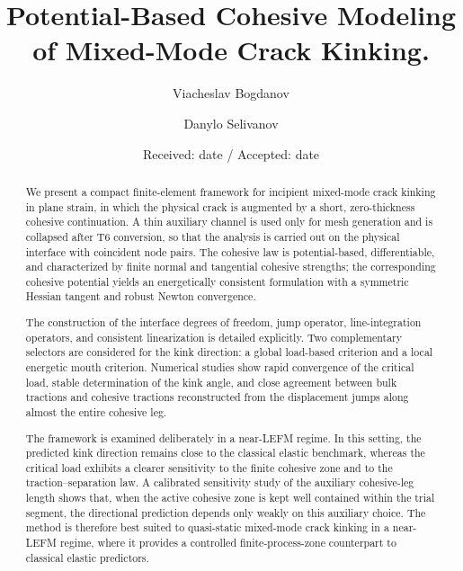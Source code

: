 \documentclass[smallextended]{svjour3}       %
\begin{document}
\title{Potential-Based Cohesive Modeling of Mixed-Mode Crack Kinking.}

\author{Viacheslav Bogdanov          \and
	Danylo Selivanov %
}



\date{Received: date / Accepted: date}


\maketitle

\begin{abstract}
	We present a compact finite-element framework for incipient mixed-mode crack
	kinking in plane strain, in which the physical crack is augmented by a short,
	zero-thickness cohesive continuation. A thin auxiliary channel is used only
	for mesh generation and is collapsed after T6 conversion, so that the
	analysis is carried out on the physical interface with coincident node pairs.
	The cohesive law is potential-based, differentiable, and characterized by finite normal and tangential cohesive strengths; the corresponding cohesive potential yields
	an energetically consistent formulation with a symmetric Hessian tangent and
	robust Newton convergence.
	
	The construction of the interface degrees of freedom, jump operator,
	line-integration operators, and consistent linearization is detailed
	explicitly. Two complementary selectors are considered for the kink
	direction: a global load-based criterion and a local energetic mouth
	criterion. Numerical studies show rapid convergence of the critical load,
	stable determination of the kink angle, and close agreement between bulk
	tractions and cohesive tractions reconstructed from the displacement jumps
	along almost the entire cohesive leg.
	
	The framework is examined deliberately in a near-LEFM regime. In this
	setting, the predicted kink direction remains close to the classical elastic
	benchmark, whereas the critical load exhibits a clearer sensitivity to the
	finite cohesive zone and to the traction--separation law. A calibrated
	sensitivity study of the auxiliary cohesive-leg length shows that, when the
	active cohesive zone is kept well contained within the trial segment, the
	directional prediction depends only weakly on this auxiliary choice. The
	method is therefore best suited to quasi-static mixed-mode crack kinking in a
	near-LEFM regime, where it provides a controlled finite-process-zone
	counterpart to classical elastic predictors.
\end{abstract}
\end{document}
